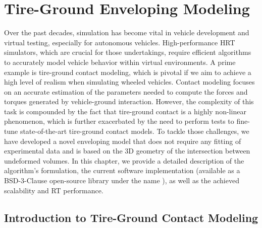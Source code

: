 
\chapter{Tire-Ground Enveloping Modeling}
\label{app2:enve}

Over the past decades, simulation has become vital in vehicle development and virtual testing, especially for autonomous vehicles. High-performance \ac{HRT} simulators, which are crucial for those undertakings, require efficient algorithms to accurately model vehicle behavior within virtual environments. A prime example is tire-ground contact modeling, which is pivotal if we aim to achieve a high level of realism when simulating wheeled vehicles. Contact modeling focuses on an accurate estimation of the parameters needed to compute the forces and torques generated by vehicle-ground interaction. However, the complexity of this task is compounded by the fact that tire-ground contact is a highly non-linear phenomenon, which is further exacerbated by the need to perform tests to fine-tune state-of-the-art tire-ground contact models. To tackle those challenges, we have developed a novel enveloping model that does not require any fitting of experimental data and is based on the 3D geometry of the intersection between undeformed volumes. In this chapter, we provide a detailed description of the algorithm's formulation, the current software implementation (available as a BSD-3-Clause open-source library under the name \Enve{}), as well as the achieved scalability and \ac{RT} performance.


\section{Introduction to Tire-Ground Contact Modeling}
\label{app2:sec:introduction}

